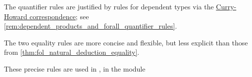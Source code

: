 \begin{comments}
  \item The quantifier rules are justified by rules for dependent types via the \hyperref[con:curry_howard_correspondence]{Curry-Howard correspondence}; see \cref{rem:dependent_products_and_forall_quantifier_rules}.

  \item The two equality rules are more concise and flexible, but less explicit than those from \cref{thm:fol_natural_deduction_equality}.

  \item These precise rules are used in \cite{notebook:code}, in the module
  \begin{CodeRefDisplay}
  \end{CodeRefDisplay}
\end{comments}

